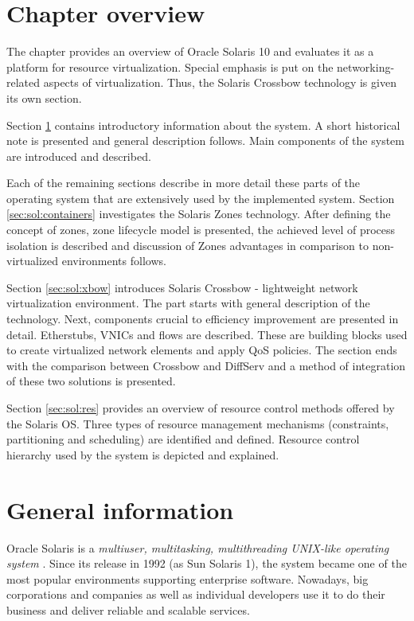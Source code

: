 \documentclass[11pt]{book}
\begin{document}
    \section*{Chapter overview}

      The chapter provides an overview of Oracle Solaris 10 and evaluates it as a platform for resource virtualization.
      Special emphasis is put on the networking-related aspects of virtualization. Thus, the Solaris Crossbow technology
      is given its own section.

      Section \ref{sec:sol:general} contains introductory information about the system. A short historical note is
      presented and general description follows. Main components of the system are introduced and described.
      
      Each of the remaining sections describe in more detail these parts of the operating system that are extensively
      used by the implemented system. Section \ref{sec:sol:containers} investigates the Solaris Zones technology. After
      defining the concept of zones, zone lifecycle model is presented, the achieved level of process isolation
      is described and discussion of Zones advantages in comparison to non-virtualized environments follows.

      Section \ref{sec:sol:xbow} introduces Solaris Crossbow - lightweight network virtualization environment. The part
      starts with general description of the technology. Next, components crucial to efficiency improvement are
      presented in detail. Etherstubs, VNICs and flows are described. These are building blocks used to create
      virtualized network elements and apply QoS policies. The section ends with the comparison between Crossbow and
      DiffServ and a method of integration of these two solutions is presented.

      Section \ref{sec:sol:res} provides an overview of resource control methods offered by the Solaris OS. Three types
      of resource management mechanisms (constraints, partitioning and scheduling) are identified and defined. Resource
      control hierarchy used by the system is depicted and explained.


    \section{General information}
    \label{sec:sol:general}

      Oracle Solaris is a \textit{multiuser, multitasking, multithreading UNIX-like operating system} \cite{reference}. Since its
      release in 1992 (as Sun Solaris 1), the system became one of the most popular environments supporting
      enterprise software. Nowadays, big corporations and companies as well as individual developers use it to do
      their business and deliver reliable and scalable services.
\end{document}
